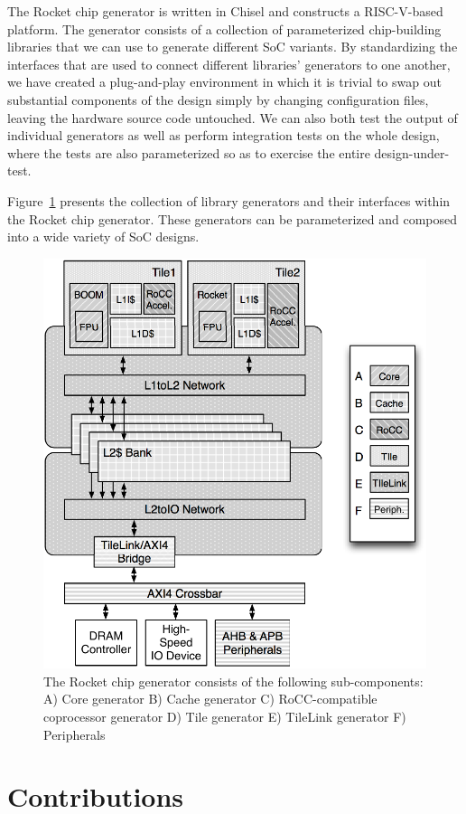 The Rocket chip generator is written in Chisel and constructs a
RISC-V-based platform.  The generator consists of a collection of
parameterized chip-building libraries that we can use to generate
different SoC variants.  By standardizing the interfaces that are used
to connect different libraries' generators to one another, we have
created a plug-and-play environment in which it is trivial to swap out
substantial components of the design simply by changing configuration
files, leaving the hardware source code untouched.  We can also both
test the output of individual generators as well as perform
integration tests on the whole design, where the tests are also
parameterized so as to exercise the entire design-under-test.

Figure~\ref{fig:generators} presents the collection of library generators and their interfaces within the Rocket chip generator.
These generators can be parameterized and composed into a wide variety of SoC designs.

\begin{figure}[t!]
\centering
\vspace{-0.3in}
\includegraphics[width=.6\columnwidth,trim=0 0 0 0.1in,clip]{figures/rocket-chip.pdf}
\vspace{-0.15in}
\caption{The Rocket chip generator consists of the following sub-components: A) Core generator B) Cache generator C) RoCC-compatible coprocessor generator D) Tile generator E) TileLink generator F) Peripherals }
\label{fig:generators}
\vspace{-0.1in}
\end{figure}

\section{Contributions}

